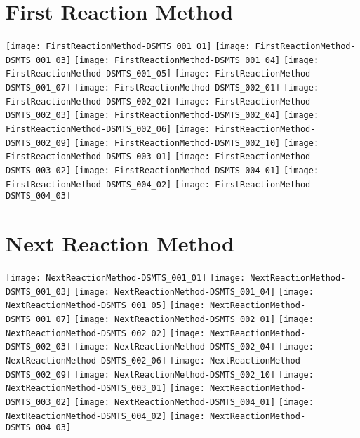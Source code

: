 \documentclass[notitlepage]{revtex4-1}
\begin{document}
\section{First Reaction Method}
\texttt{[image: FirstReactionMethod-DSMTS\_001\_01]}
\texttt{[image: FirstReactionMethod-DSMTS\_001\_03]}
\texttt{[image: FirstReactionMethod-DSMTS\_001\_04]}
\texttt{[image: FirstReactionMethod-DSMTS\_001\_05]}
\texttt{[image: FirstReactionMethod-DSMTS\_001\_07]}
\texttt{[image: FirstReactionMethod-DSMTS\_002\_01]}
\texttt{[image: FirstReactionMethod-DSMTS\_002\_02]}
\texttt{[image: FirstReactionMethod-DSMTS\_002\_03]}
\texttt{[image: FirstReactionMethod-DSMTS\_002\_04]}
\texttt{[image: FirstReactionMethod-DSMTS\_002\_06]}
\texttt{[image: FirstReactionMethod-DSMTS\_002\_09]}
\texttt{[image: FirstReactionMethod-DSMTS\_002\_10]}
\texttt{[image: FirstReactionMethod-DSMTS\_003\_01]}
\texttt{[image: FirstReactionMethod-DSMTS\_003\_02]}
\texttt{[image: FirstReactionMethod-DSMTS\_004\_01]}
\texttt{[image: FirstReactionMethod-DSMTS\_004\_02]}
\texttt{[image: FirstReactionMethod-DSMTS\_004\_03]}

\section{Next Reaction Method}
\texttt{[image: NextReactionMethod-DSMTS\_001\_01]}
\texttt{[image: NextReactionMethod-DSMTS\_001\_03]}
\texttt{[image: NextReactionMethod-DSMTS\_001\_04]}
\texttt{[image: NextReactionMethod-DSMTS\_001\_05]}
\texttt{[image: NextReactionMethod-DSMTS\_001\_07]}
\texttt{[image: NextReactionMethod-DSMTS\_002\_01]}
\texttt{[image: NextReactionMethod-DSMTS\_002\_02]}
\texttt{[image: NextReactionMethod-DSMTS\_002\_03]}
\texttt{[image: NextReactionMethod-DSMTS\_002\_04]}
\texttt{[image: NextReactionMethod-DSMTS\_002\_06]}
\texttt{[image: NextReactionMethod-DSMTS\_002\_09]}
\texttt{[image: NextReactionMethod-DSMTS\_002\_10]}
\texttt{[image: NextReactionMethod-DSMTS\_003\_01]}
\texttt{[image: NextReactionMethod-DSMTS\_003\_02]}
\texttt{[image: NextReactionMethod-DSMTS\_004\_01]}
\texttt{[image: NextReactionMethod-DSMTS\_004\_02]}
\texttt{[image: NextReactionMethod-DSMTS\_004\_03]}
\end{document}
